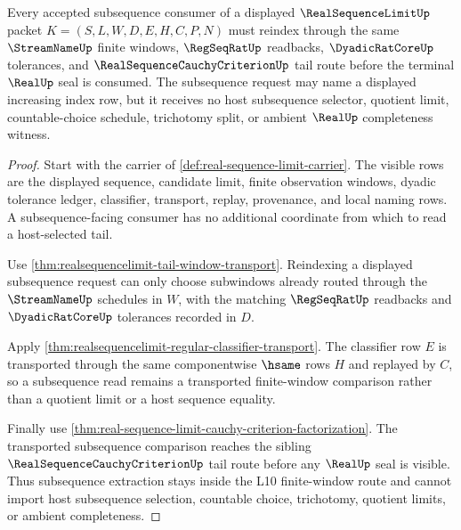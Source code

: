 \begin{theorem}
\label{thm:realsequencelimit-subsequence-tail-stability}
Every accepted subsequence consumer of a displayed $\RealSequenceLimitUp$ packet $K=(S,L,W,D,E,H,C,P,N)$ must reindex through the same $\StreamNameUp$ finite windows, $\RegSeqRatUp$ readbacks, $\DyadicRatCoreUp$ tolerances, and $\RealSequenceCauchyCriterionUp$ tail route before the terminal $\RealUp$ seal is consumed. The subsequence request may name a displayed increasing index row, but it receives no host subsequence selector, quotient limit, countable-choice schedule, trichotomy split, or ambient $\RealUp$ completeness witness.
\end{theorem}
\begin{proof}
Start with the carrier of \autoref{def:real-sequence-limit-carrier}. The visible rows are the displayed sequence, candidate limit, finite observation windows, dyadic tolerance ledger, classifier, transport, replay, provenance, and local naming rows. A subsequence-facing consumer has no additional coordinate from which to read a host-selected tail.

Use \autoref{thm:realsequencelimit-tail-window-transport}. Reindexing a displayed subsequence request can only choose subwindows already routed through the $\StreamNameUp$ schedules in $W$, with the matching $\RegSeqRatUp$ readbacks and $\DyadicRatCoreUp$ tolerances recorded in $D$.

Apply \autoref{thm:realsequencelimit-regular-classifier-transport}. The classifier row $E$ is transported through the same componentwise $\hsame$ rows $H$ and replayed by $C$, so a subsequence read remains a transported finite-window comparison rather than a quotient limit or a host sequence equality.

Finally use \autoref{thm:real-sequence-limit-cauchy-criterion-factorization}. The transported subsequence comparison reaches the sibling $\RealSequenceCauchyCriterionUp$ tail route before any $\RealUp$ seal is visible. Thus subsequence extraction stays inside the L10 finite-window route and cannot import host subsequence selection, countable choice, trichotomy, quotient limits, or ambient completeness.
\end{proof}

